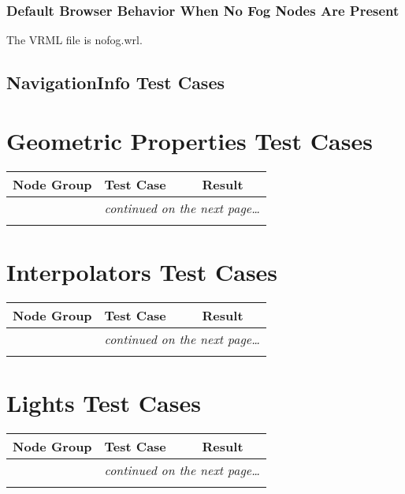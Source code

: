\documentclass[12pt,letterpaper]{article}
\newcounter{testCaseCtr}
\newcommand{\resetTestCase}{\setcounter{testCaseCtr}{1}}
\newcommand{\FogA}{Default Browser Behavior When No Fog Nodes Are Present}
\begin{document}
\subsubsection{\FogA}
The VRML file is nofog.wrl.

\subsection{NavigationInfo Test Cases}
\section{Geometric Properties Test Cases}
\resetTestCase

\begin{center}
\setlongtables
\begin{longtable}{|l|l|l|}
\hline
\textbf{Node Group} & \textbf{Test Case} & \textbf{Result} \\
\hline\hline
\endhead
 & \multicolumn{2}{|r|}{\textsl{continued on the next page\ldots}} \\
\hline
\endfoot
\hline
\endlastfoot
& & \\
\cline{2-3}
\end{longtable}
\end{center}

\section{Interpolators Test Cases}
\resetTestCase

\begin{center}
\setlongtables
\begin{longtable}{|l|l|l|}
\hline
\textbf{Node Group} & \textbf{Test Case} & \textbf{Result} \\
\hline\hline
\endhead
 & \multicolumn{2}{|r|}{\textsl{continued on the next page\ldots}} \\
\hline
\endfoot
\hline
\endlastfoot
& & \\
\cline{2-3}
\end{longtable}
\end{center}

\section{Lights Test Cases}
\resetTestCase

\begin{center}
\setlongtables
\begin{longtable}{|l|l|l|}
\hline
\textbf{Node Group} & \textbf{Test Case} & \textbf{Result} \\
\hline\hline
\endhead
 & \multicolumn{2}{|r|}{\textsl{continued on the next page\ldots}} \\
\hline
\endfoot
\hline
\endlastfoot
& & \\
\cline{2-3}
\end{longtable}
\end{center}
\end{document}
